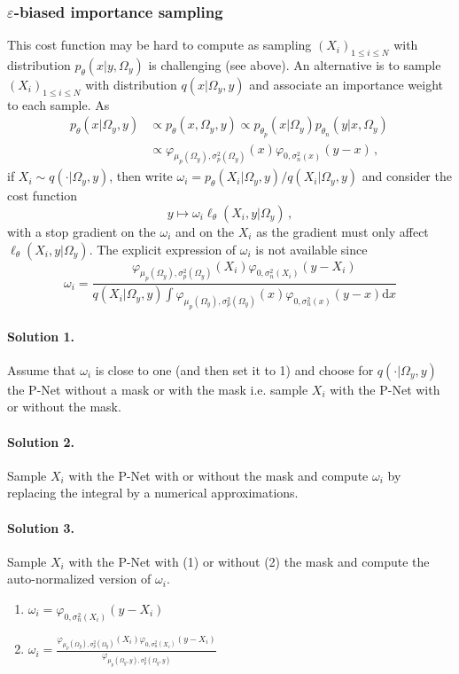 \documentclass[review]{cvpr}
\begin{document}
\subsubsection{$\varepsilon$-biased importance sampling}
This cost function may be hard to compute as sampling $(X_i)_{1\leqslant i \leqslant N}$ with distribution $p_\theta(x|y,\Omega_y)$ is challenging (see above). An alternative is to sample $(X_i)_{1\leqslant i \leqslant N}$ with distribution $q(x|\Omega_y,y)$ and associate an importance weight to each sample. As
\begin{align*}
p_\theta(x|\Omega_y,y) &\propto p_\theta(x,\Omega_y,y) \propto p_{\theta_p}(x|\Omega_y)p_{\theta_n}(y|x,\Omega_y)\,\\
&\propto \varphi_{\mu_p(\Omega_y),\sigma^2_p(\Omega_y)}(x)   \varphi_{0,\sigma_n^2(x)}(y-x)\,,
\end{align*}
if $X_i \sim q(\cdot|\Omega_y,y)$, then write $\omega_i = p_\theta(X_i|\Omega_y,y)/q(X_i|\Omega_y,y)$ and consider the cost function
$$
y \mapsto \omega_i \ell_{\theta}(X_i,y|\Omega_y) \,,
$$
with a stop gradient on the $\omega_i$ and on the $X_i$ as the gradient must only affect $\ell_{\theta}(X_i,y|\Omega_y)$. The explicit expression of $\omega_i$ is not available since
$$
\omega_i = \frac{\varphi_{\mu_p(\Omega_y),\sigma^2_p(\Omega_y)}(X_i)   \varphi_{0,\sigma_n^2(X_i)}(y-X_i)}{q(X_i|\Omega_y,y) \int \varphi_{\mu_p(\Omega_y),\sigma^2_p(\Omega_y)}(x)   \varphi_{0,\sigma_n^2(x)}(y-x) \mathrm{d} x}
$$
\paragraph{Solution 1.} Assume that $\omega_i$ is close to one (and then set it to 1) and choose for $q(\cdot|\Omega_y,y)$ the P-Net without a mask or with the mask i.e. sample $X_i$ with the P-Net with or without the mask.

\paragraph{Solution 2.} Sample $X_i$ with the P-Net with or without the mask and compute $\omega_i$ by replacing the integral by a numerical approximations.

\paragraph{Solution 3.} Sample $X_i$ with the P-Net with (1) or without (2) the mask and compute the auto-normalized version of $\omega_i$.
\begin{enumerate}
\item $\omega_i = \varphi_{0,\sigma_n^2(X_i)}(y-X_i)$
\item $\omega_i = \frac{ \varphi_{\mu_p(\Omega_y),\sigma^2_p(\Omega_y)}(X_i)   \varphi_{0,\sigma_n^2(X_i)}(y-X_i)}{\varphi_{\mu_p(\Omega_y,y),\sigma^2_p(\Omega_y,y)}}$
\end{enumerate}
\end{document}
